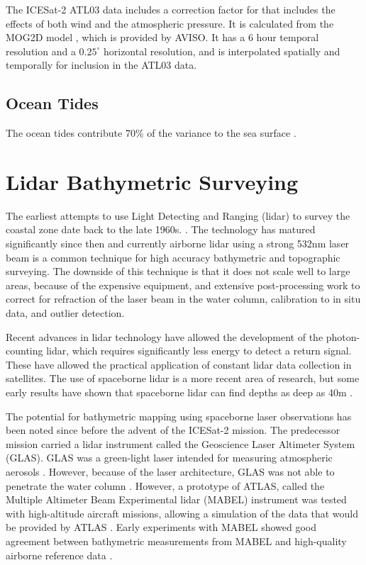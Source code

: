 The ICESat-2 ATL03 data includes a correction factor for that includes the effects of both wind and the atmospheric pressure. It is calculated from the MOG2D model \parencite{LeProvost1994}, which is provided by AVISO. It has a 6 hour temporal resolution and a $0.25^{\circ}$ horizontal resolution, and is interpolated spatially and temporally for inclusion in the ATL03 data.

\subsection{Ocean Tides}


The ocean tides contribute 70\% of the variance to the sea surface \parencite{Robbins2022}.

\section{Lidar Bathymetric Surveying}

The earliest attempts to use Light Detecting and Ranging (lidar) to survey the coastal zone date back to the late 1960s. \parencite{Bailly2016}. The technology has matured significantly since then and currently airborne lidar using a strong 532nm laser beam is a common technique for high accuracy bathymetric and topographic surveying. The downside of this technique is that it does not scale well to large areas, because of the expensive equipment, and extensive post-processing work to correct for refraction of the laser beam in the water column, calibration to in situ data, and outlier detection.

Recent advances in lidar technology have allowed the development of the photon-counting lidar, which requires significantly less energy to detect a return signal. These have allowed the practical application of constant lidar data collection in satellites. The use of spaceborne lidar is a more recent area of research, but some early results have shown that spaceborne lidar can find depths as deep as 40m \parencite{Parrish2019}.

The potential for bathymetric mapping using spaceborne laser observations has been noted since before the advent of the ICESat-2 mission. The predecessor mission carried a lidar instrument called the Geoscience Laser Altimeter System (GLAS). GLAS was a green-light laser intended for measuring atmospheric aerosols \parencite{Abshire2005}. However, because of the laser architecture, GLAS was not able to penetrate the water column \parencite{Forfinski-Sarkozi2016}. However, a prototype of ATLAS, called the Multiple Altimeter Beam Experimental lidar (MABEL) instrument was tested with high-altitude aircraft missions, allowing a simulation of the data that would be provided by ATLAS \parencite{Mcgill2013}. Early experiments with MABEL showed good agreement between bathymetric measurements from MABEL and high-quality airborne reference data \parencite{Jasinski2016,Forfinski-Sarkozi2016}.


